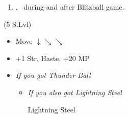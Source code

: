 \begin{enumerate}[resume]
    \item \cs[2:00], \sd\ during and after Blitzball game.
\end{enumerate}
\begin{spheregrid}
    \begin{itemize}
        \tidusf (5 S.Lvl)
        \begin{itemize}
            \item Move $\downarrow \searrow\searrow$
            \item +1 Str, Haste, +20 MP
        \end{itemize}
    \end{itemize}
\end{spheregrid}
\begin{equip}
    \begin{itemize}
        \item \textit{If you got Thunder Ball}
        \begin{itemize}
            \wakkaf Thunder Ball
            \item \textit{If you also got Lightning Steel}
            \begin{itemize}
                \tidusf Lightning Steel
            \end{itemize}
        \end{itemize}
    \end{itemize}
\end{equip}
